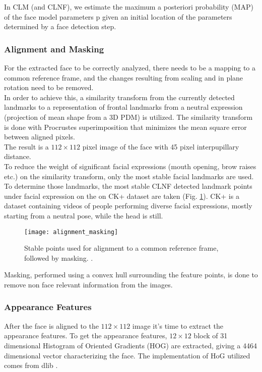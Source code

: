 In CLM (and CLNF), we estimate the maximum a posteriori probability (MAP) of the face model parameters p given an initial location of the parameters determined by a face detection step.

\subsubsection{Alignment and Masking}
For the extracted face to be correctly analyzed, there needs to be a mapping to a common reference frame, and the changes resulting from scaling and in plane rotation need to be removed. \\
In order to achieve this, a similarity transform from the currently detected landmarks to a representation of frontal landmarks from a neutral expression (projection of mean shape from a 3D PDM) is utilized. The similarity transform is done with Procrustes superimposition that minimizes the mean square error between aligned pixels.\\
The result is a $112 \times 112$ pixel image of the face with 45 pixel interpupillary distance. \\
To reduce the weight of significant facial expressions (mouth opening, brow raises etc.) on the similarity transform, only the most stable facial landmarks are used. \\
To determine those landmarks, the most stable CLNF detected landmark points under facial expression on the on CK+ dataset \cite{CK+} are taken (Fig. \ref{fig:alignment_masking}). CK+ is a dataset containing videos of people performing diverse facial expressions, mostly starting from a neutral pose, while the head is still.

\begin{figure}[H]
	\centering
	\texttt{[image: alignment\_masking]}
	\caption{Stable points used for alignment to a common reference frame, followed by masking. \cite{Baltru2015}.}
	\label{fig:alignment_masking}
\end{figure}

Masking, performed using a convex hull surrounding the feature points, is done to remove non face relevant information from the images.

\subsubsection{Appearance Features}
After the face is aligned to the $112 \times 112$ image it's time to extract the appearance features. To get the appearance features, $12 \times 12$ block of 31 dimensional Histogram of Oriented Gradients (HOG) are extracted, giving a 4464 dimensional vector characterizing the face. The implementation of HoG utilized comes from dlib \cite{dlib}.\\

